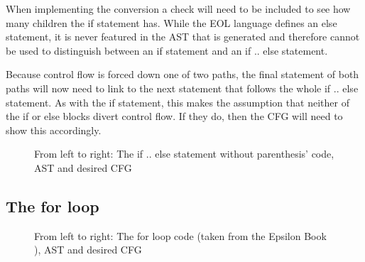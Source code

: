 When implementing the conversion a check will need to be included to see how many children the if statement has. While the EOL language defines an else statement, it is never featured in the AST that is generated and therefore cannot be used to distinguish between an if statement and an if .. else statement. 

Because control flow is forced down one of two paths, the final statement of both paths will now need to link to the next statement that follows the whole if .. else statement. As with the if statement, this makes the assumption that neither of the if or else blocks divert control flow. If they do, then the CFG will need to show this accordingly.

\begin{figure}
\centering
\begin{minipage}{.3\textwidth}
  \centering
  
\end{minipage}%
\begin{minipage}{.3\textwidth}
  \centering
\end{minipage}
\begin{minipage}{.3\textwidth}
  \centering
\end{minipage}
\caption{From left to right: The if .. else statement without parenthesis' code, AST and desired CFG}
\label{fig:ifelse}
\end{figure}

\subsection{The for loop}

\begin{figure}
\centering
\begin{minipage}{.3\textwidth}
  \centering
  
\end{minipage}%
\begin{minipage}{.3\textwidth}
  \centering
\end{minipage}
\begin{minipage}{.3\textwidth}
  \centering
\end{minipage}
\caption{From left to right: The for loop code (taken from the Epsilon Book \cite{epsilonBook}), AST and desired CFG}
\label{fig:for}
\end{figure}

